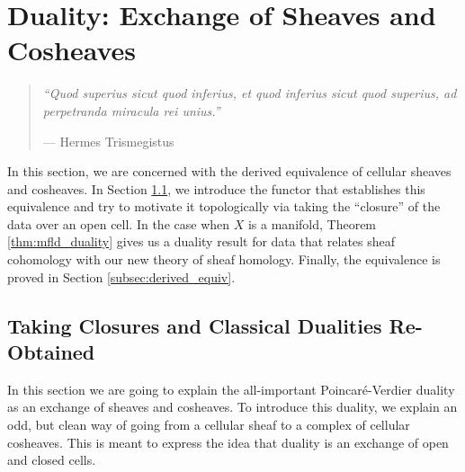
%
%

\chapter{Duality: Exchange of Sheaves and Cosheaves}
\label{sec:duality}

\begin{quote}
{\em ``Quod superius sicut quod inferius, et quod inferius sicut quod superius, ad perpetranda miracula rei unius.''}
\begin{flushright} --- Hermes Trismegistus~\cite[p. xxix]{vaughan1888magical} \end{flushright}

\end{quote}

In this section, we are concerned with the derived equivalence of cellular sheaves and cosheaves. In Section \ref{subsec:closures}, we introduce the functor that establishes this equivalence and try to motivate it topologically via taking the ``closure'' of the data over an open cell. In the case when $X$ is a manifold, Theorem \ref{thm:mfld_duality} gives us a duality result for data that relates sheaf cohomology with our new theory of sheaf homology. Finally, the equivalence is proved in Section \ref{subsec:derived_equiv}.

\section{Taking Closures and Classical Dualities Re-Obtained}
\label{subsec:closures}

In this section we are going to explain the all-important Poincar\'e-Verdier duality as an exchange of sheaves and cosheaves. To introduce this duality, we explain an odd, but clean way of going from a cellular sheaf to a complex of cellular cosheaves. This is meant to express the idea that duality is an exchange of open and closed cells.

